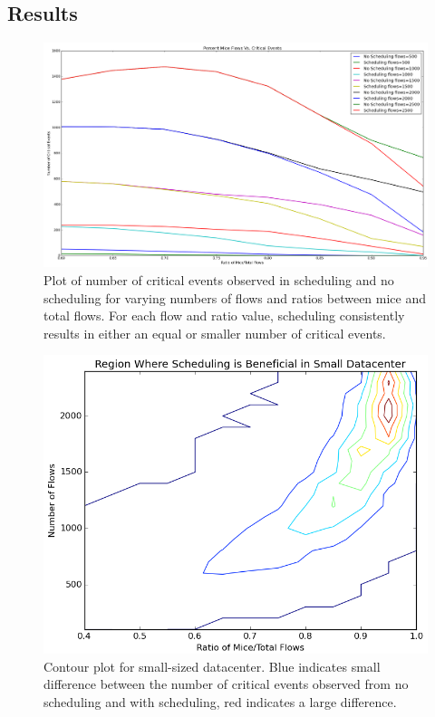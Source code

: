 \fi

\subsection{Results}

\begin{figure}
	\centering
	\includegraphics[width=1.5\columnwidth]{crit_plot.png}
	\caption{Plot of number of critical events observed in scheduling and no
    scheduling for varying numbers of flows and ratios between mice and total
    flows. For each flow and ratio value, scheduling consistently results in
    either an equal or smaller number of critical events.}
	\label{fig:critplt}
\end{figure}

\begin{figure}
	\centering
	\includegraphics[width=\columnwidth]{small_datacenter.png}
	\caption{Contour plot for small-sized datacenter. Blue indicates small
    difference between the number of critical events observed from no
    scheduling and with scheduling, red indicates a large difference.}
	\label{fig:smalldc}
\end{figure}

